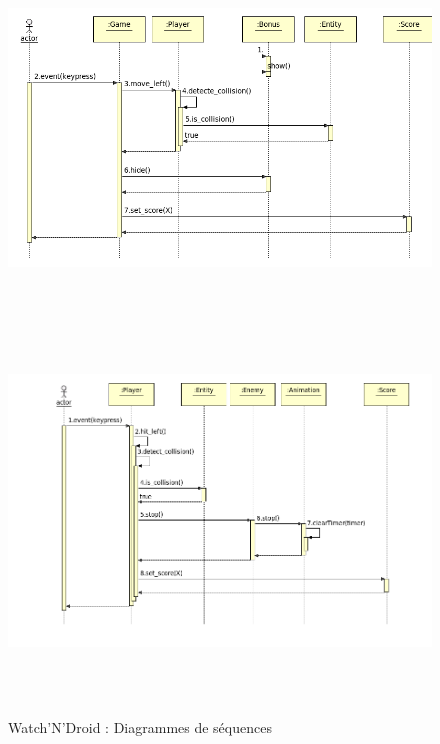 \begin{figure}[h]
 \centering
 \includegraphics[height=9.5cm]{../umls/UML_images/WatchNDroid/sequence} \hfill
 \includegraphics[height=10cm]{../umls/UML_images/WatchNDroid/sequence2} \hfill
 \caption{Watch'N'Droid : Diagrammes de séquences}
\end{figure}


\clearpage

